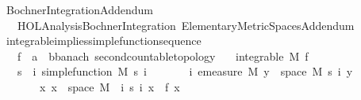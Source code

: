 %
\begin{isabellebody}%
%
%
\isadelimtheory
%
\endisadelimtheory
%
\isatagtheory
{}\isamarkupfalse%
\ Bochner{\isacharunderscore}{\kern0pt}Integration{\isacharunderscore}{\kern0pt}Addendum\isanewline
\ \ \ {\isachardoublequoteopen}HOL{\isacharminus}{\kern0pt}Analysis{\isachardot}{\kern0pt}Bochner{\isacharunderscore}{\kern0pt}Integration{\isachardoublequoteclose}\ Elementary{\isacharunderscore}{\kern0pt}Metric{\isacharunderscore}{\kern0pt}Spaces{\isacharunderscore}{\kern0pt}Addendum\isanewline
{}%
\endisatagtheory
{\isafoldtheory}%
%
\isadelimtheory
%
\endisadelimtheory
%
\isadelimdocument
%
\endisadelimdocument
%
\isatagdocument
%
\isamarkuptrue%
%
\isamarkuptrue%
%
\endisatagdocument
{\isafolddocument}%
%
\isadelimdocument
%
\endisadelimdocument
{}\isamarkupfalse%
\ integrable{\isacharunderscore}{\kern0pt}implies{\isacharunderscore}{\kern0pt}simple{\isacharunderscore}{\kern0pt}function{\isacharunderscore}{\kern0pt}sequence{\isacharcolon}{\kern0pt}\isanewline
\ \ \ f\ {\isacharcolon}{\kern0pt}{\isacharcolon}{\kern0pt}\ {\isachardoublequoteopen}{\isacharprime}{\kern0pt}a\ {\isasymRightarrow}\ {\isacharprime}{\kern0pt}b{\isacharcolon}{\kern0pt}{\isacharcolon}{\kern0pt}{\isacharbraceleft}{\kern0pt}banach{\isacharcomma}{\kern0pt}\ second{\isacharunderscore}{\kern0pt}countable{\isacharunderscore}{\kern0pt}topology{\isacharbraceright}{\kern0pt}{\isachardoublequoteclose}\isanewline
\ \ \ {\isachardoublequoteopen}integrable\ M\ f{\isachardoublequoteclose}\isanewline
\ \ \ s\ \ {\isachardoublequoteopen}{\isasymAnd}i{\isachardot}{\kern0pt}\ simple{\isacharunderscore}{\kern0pt}function\ M\ {\isacharparenleft}{\kern0pt}s\ i{\isacharparenright}{\kern0pt}{\isachardoublequoteclose}\isanewline
\ \ \ \ \ \ \ {\isachardoublequoteopen}{\isasymAnd}i{\isachardot}{\kern0pt}\ emeasure\ M\ {\isacharbraceleft}{\kern0pt}y\ {\isasymin}\ space\ M{\isachardot}{\kern0pt}\ s\ i\ y\ {\isasymnoteq}\ {}{\isacharbraceright}{\kern0pt}\ {\isasymnoteq}\ {\isasyminfinity}{\isachardoublequoteclose}\isanewline
\ \ \ \ \ \ \ {\isachardoublequoteopen}{\isasymAnd}x{\isachardot}{\kern0pt}\ x\ {\isasymin}\ space\ M\ {\isasymLongrightarrow}\ {\isacharparenleft}{\kern0pt}{\isasymlambda}i{\isachardot}{\kern0pt}\ s\ i\ x{\isacharparenright}{\kern0pt}\ {\isasymlonglonglongrightarrow}\ f\ x{\isachardoublequoteclose}\isanewline

\end{isabellebody}
